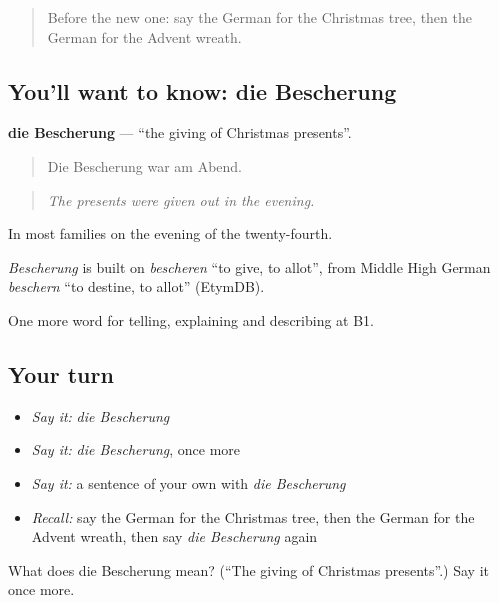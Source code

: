 \begin{quote}
Before the new one: say the German for the Christmas tree, then the German for the Advent wreath.
\end{quote}

\subsection*{You'll want to know: die Bescherung}
\textbf{die Bescherung} — \textquotedblleft{}the giving of Christmas presents\textquotedblright{}.

\begin{quote}
Die Bescherung war am Abend.
\end{quote}

\begin{quote}
\emph{The presents were given out in the evening.}
\end{quote}

In most families on the evening of the twenty-fourth.

\begin{cousinweb}
\emph{Bescherung} is built on \emph{bescheren} \textquotedblleft{}to give, to allot\textquotedblright{}, from Middle High German \emph{beschern} \textquotedblleft{}to destine, to allot\textquotedblright{} (EtymDB).
\end{cousinweb}

\begin{grammarlens}[title={What you've built}]
One more word for telling, explaining and describing at B1.
\end{grammarlens}

\subsection*{Your turn}
\begin{itemize}
\raggedright
  \item \emph{Say it:} \emph{die Bescherung}
  \item \emph{Say it:} \emph{die Bescherung}, once more
  \item \emph{Say it:} a sentence of your own with \emph{die Bescherung}
  \item \emph{Recall:} say the German for the Christmas tree, then the German for the Advent wreath, then say \emph{die Bescherung} again
\end{itemize}

\begin{tcolorbox}[breakable,colback=teal!4,colframe=teal!35!black,title={Before you move on}]
What does die Bescherung mean? (\textquotedblleft{}The giving of Christmas presents\textquotedblright{}.) Say it once more.
\end{tcolorbox}
